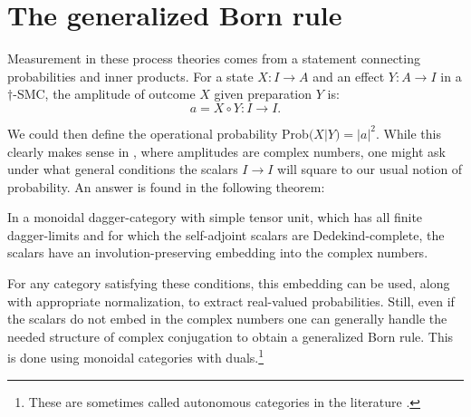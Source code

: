 \section{The generalized Born rule}
\label{sec:bornrule}
Measurement in these process theories comes from a statement connecting probabilities and inner products. For a state $X:I\to A$ and an effect $Y:A\to I$ in a $\dagger$-SMC, the amplitude of outcome $X$ given preparation $Y$ is:
\begin{equation}
a = X\circ Y:I\to I.
\end{equation}


\noindent We could then define the operational probability Prob$(X|Y)=|a|^2$. While this clearly makes sense in , where amplitudes are complex numbers, one might ask under what general conditions the scalars $I\to I$ will square to our usual notion of probability. An answer is found in the following theorem:
\begin{theorem}{\cite[Thm 4.2]{vicary2011completeness}}
In a monoidal dagger-category with simple tensor unit, which has all finite dagger-limits and for which the self-adjoint scalars are Dedekind-complete, the scalars have an involution-preserving embedding into the complex numbers.
\end{theorem}
\noindent For any category satisfying these conditions, this embedding can be used, along with appropriate normalization, to extract real-valued probabilities. Still, even if the scalars do not embed in the complex numbers one can generally handle the needed structure of complex conjugation to obtain a generalized Born rule. This is done using monoidal categories with duals.\footnote{These are sometimes called autonomous categories in the literature \cite{joyal1993braided,selinger2011survey}.}

